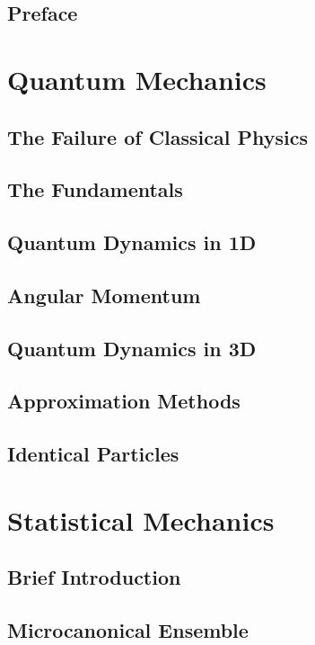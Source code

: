 \documentclass[a4paper, 11pt]{book}
\newcommand{\1}{\opr{\mathds{1}}}
\theoremstyle{definition}
\theoremstyle{remark}
\begin{document}

\chapter*{Preface}
	
\tableofcontents
{}
\part{Quantum Mechanics}
	\chapter{The Failure of Classical Physics}
		
	\chapter{The Fundamentals}
		
	\chapter{Quantum Dynamics in 1D}
		
		\chapter{Angular Momentum}
		
	\chapter{Quantum Dynamics in 3D}
		
	\chapter{Approximation Methods}
		
	\chapter{Identical Particles}
		
\part{Statistical Mechanics}
	\chapter{Brief Introduction}
		
	\chapter{Microcanonical Ensemble}
		
\end{document}
